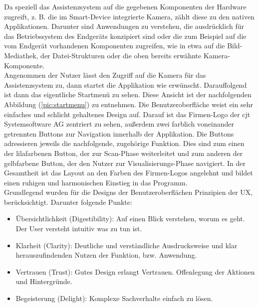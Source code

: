 Da speziell das Assistenzsystem auf die gegebenen Komponenten der Hardware zugreift, z. B. die im Smart-Device integrierte Kamera, zählt diese zu den nativen Applikationen. 
Darunter sind Anwendungen zu verstehen, die ausdrücklich für das Betriebssystem des Endgeräts konzipiert sind oder die zum Beispiel auf die vom Endgerät vorhandenen 
Komponenten zugreifen, wie in etwa auf die Bild-Mediathek, der Datei-Strukturen oder die oben bereits erwähnte Kamera-Komponente.
\\ 
\linebreak
Angenommen der Nutzer lässt den Zugriff auf die Kamera für das Assistenzsystem zu, dann startet die Applikation wie erwünscht. Darauffolgend ist dann 
das eigentliche Startmenü zu sehen. Diese Ansicht ist der nachfolgenden Abbildung (\ref{pic:startmenu}) zu entnehmen. Die Benutzeroberfläche weist ein sehr einfaches und 
schlicht gehaltenes Design auf. 
Darauf ist das Firmen-Logo der cjt Systemsoftware AG zentriert zu sehen, außerdem zwei farblich voneinander getrennten Buttons zur Navigation innerhalb der Applikation. 
Die Buttons adressieren jeweils die nachfolgende, zugehörige Funktion. Dies sind zum einen der lilafarbenen Button, der zur Scan-Phase weiterleitet und zum anderen der 
gelbfarbene Button, der den Nutzer zur Visualisierungs-Phase navigiert. In der Gesamtheit ist das Layout an den Farben des Firmen-Logos angelehnt und bildet einen 
ruhigen und harmonischen Einstieg in das Programm. 
\\ 
\linebreak
Grundlegend wurden für die Designs der Benutzeroberflächen Prinzipien der \ac{UX}, berücksichtigt. Darunter folgende Punkte: 
\pagebreak
\begin{itemize}
    \item Übersichtlichkeit (Digestibility): Auf einen Blick verstehen, worum es geht. Der User versteht intuitiv was zu tun ist.
    \item Klarheit (Clarity): Deutliche und verständliche Ausdrucksweise und klar herauszufindenden Nutzen der Funktion, bzw. Anwendung.
    \item Vertrauen (Trust): Gutes Design erlangt Vertrauen. Offenlegung der Aktionen und Hintergründe. 
    \item Begeisterung (Delight): Komplexe Sachverhalte einfach zu lösen. 
\end{itemize} 

